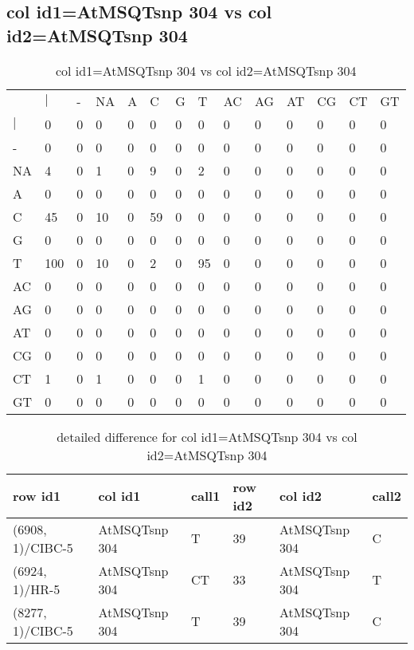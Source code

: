 \subsection{col id1=AtMSQTsnp 304 vs col id2=AtMSQTsnp 304}
\begin{center}
\begin{longtable}{|l|l|l|l|l|l|l|l|l|l|l|l|l|l|}
\caption{col id1=AtMSQTsnp 304 vs col id2=AtMSQTsnp 304} \label{table_dm836}\\
\hline
\\
\hline
&$|$&-&NA&A&C&G&T&AC&AG&AT&CG&CT&GT\\
$|$&0&0&0&0&0&0&0&0&0&0&0&0&0\\
-&0&0&0&0&0&0&0&0&0&0&0&0&0\\
NA&4&0&1&0&9&0&2&0&0&0&0&0&0\\
A&0&0&0&0&0&0&0&0&0&0&0&0&0\\
C&45&0&10&0&59&0&0&0&0&0&0&0&0\\
G&0&0&0&0&0&0&0&0&0&0&0&0&0\\
T&100&0&10&0&2&0&95&0&0&0&0&0&0\\
AC&0&0&0&0&0&0&0&0&0&0&0&0&0\\
AG&0&0&0&0&0&0&0&0&0&0&0&0&0\\
AT&0&0&0&0&0&0&0&0&0&0&0&0&0\\
CG&0&0&0&0&0&0&0&0&0&0&0&0&0\\
CT&1&0&1&0&0&0&1&0&0&0&0&0&0\\
GT&0&0&0&0&0&0&0&0&0&0&0&0&0\\
\hline
\end{longtable}
\end{center}

\begin{center}
\begin{longtable}{|l|l|l|l|l|l|}
\caption{detailed difference for col id1=AtMSQTsnp 304 vs col id2=AtMSQTsnp 304} \label{table_dm837}\\
\hline
row id1&col id1&call1&row id2&col id2&call2\\
\hline
(6908, 1)/CIBC-5&AtMSQTsnp 304&T&39&AtMSQTsnp 304&C\\
(6924, 1)/HR-5&AtMSQTsnp 304&CT&33&AtMSQTsnp 304&T\\
(8277, 1)/CIBC-5&AtMSQTsnp 304&T&39&AtMSQTsnp 304&C\\
\hline
\end{longtable}
\end{center}

